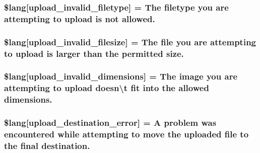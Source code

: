 \subsubsection[{\$lang}]{\setlength{\rightskip}{0pt plus 5cm}\$lang\mbox{[}\textquotesingle{}upload\+\_\+invalid\+\_\+filetype\textquotesingle{}\mbox{]} = \textquotesingle{}The filetype you are attempting to upload is not allowed.\textquotesingle{}}\label{upload__lang_8php_ac8631aa85ed80396bd78e91a76d5fd38}
\hypertarget{upload__lang_8php_a832b3ec1d84b1d48a488cf525954d8f2}{}
\subsubsection[{\$lang}]{\setlength{\rightskip}{0pt plus 5cm}\$lang\mbox{[}\textquotesingle{}upload\+\_\+invalid\+\_\+filesize\textquotesingle{}\mbox{]} = \textquotesingle{}The file you are attempting to upload is larger than the permitted size.\textquotesingle{}}\label{upload__lang_8php_a832b3ec1d84b1d48a488cf525954d8f2}
\hypertarget{upload__lang_8php_a4e796eeccf7df90acffea7884a5bd558}{}
\subsubsection[{\$lang}]{\setlength{\rightskip}{0pt plus 5cm}\$lang\mbox{[}\textquotesingle{}upload\+\_\+invalid\+\_\+dimensions\textquotesingle{}\mbox{]} = \textquotesingle{}The image you are attempting to upload doesn\textbackslash{}\textquotesingle{}t fit into the allowed dimensions.\textquotesingle{}}\label{upload__lang_8php_a4e796eeccf7df90acffea7884a5bd558}
\hypertarget{upload__lang_8php_a31be70c748b9bfc43dd7468e1fa64c42}{}
\subsubsection[{\$lang}]{\setlength{\rightskip}{0pt plus 5cm}\$lang\mbox{[}\textquotesingle{}upload\+\_\+destination\+\_\+error\textquotesingle{}\mbox{]} = \textquotesingle{}A problem was encountered while attempting to move the uploaded file to the final destination.\textquotesingle{}}\label{upload__lang_8php_a31be70c748b9bfc43dd7468e1fa64c42}
\hypertarget{upload__lang_8php_a3c17908c53072c6a5ef593760aaaa704}{}
